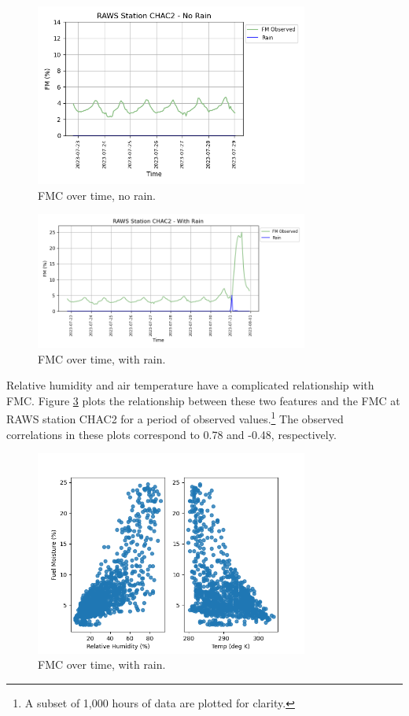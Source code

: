 \documentclass[11pt]{article}%
\begin{document}
\begin{figure}[ht]
    \centering
    \includegraphics[width=0.8\textwidth]{images/no_rain_plot.png}
    \caption{FMC over time, no rain.}
    \label{fig:fmc_no_rain}
\end{figure}

\begin{figure}[ht]
    \centering
    \includegraphics[width=0.8\textwidth]{images/rain_plot.png}
    \caption{FMC over time, with rain.}
    \label{fig:fmc_with_rain}
\end{figure}

Relative humidity and air temperature have a complicated relationship with FMC. Figure \ref{fig:rh_temp_plot} plots the relationship between these two features and the FMC at RAWS station CHAC2 for a period of observed values.\footnote{A subset of 1,000 hours of data are plotted for clarity.} The observed correlations in these plots correspond to 0.78 and -0.48, respectively. 

\begin{figure}[ht]
    \centering
    \includegraphics[width=0.8\textwidth]{images/rh_temp_plot.png}
    \caption{FMC over time, with rain.}
    \label{fig:rh_temp_plot}
\end{figure}
\end{document}
